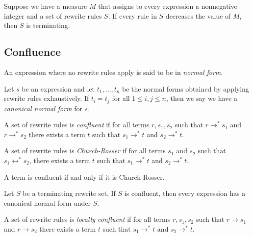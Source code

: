 \documentclass{article}
\begin{document}
\begin{theorem}
    Suppose we have a measure $M$ that assigns to every expression a nonnegative integer and
    a set of rewrite rules $S$. If every rule in $S$ decreases the value of $M$, then $S$ 
    is terminating.
\end{theorem}

\subsection{Confluence}

\begin{definition}
    An expression where no rewrite rules apply is said to be in \emph{normal form}.
\end{definition}

\begin{definition}
    Let $s$ be an expression and let $t_1, ..., t_n$ be the normal forms obtained by 
    applying rewrite rules exhaustively. If $t_i=t_j$ for all $1\leq i,j\leq n$, then we 
    say we have a \emph{canonical normal form} for $s$.
\end{definition}

\begin{definition}
    A set of rewrite rules is \emph{confluent} if for all terms $r,s_1,s_2$ such that 
    $r\to^*s_1$ and $r\to^*s_2$ there exists a term $t$ such that 
    $s_1\to^*t$ and $s_2\to^*t$.
\end{definition}

\begin{definition}
    A set of rewrite rules is \emph{Church-Rosser} if for all terms $s_1$ and $s_2$
    such that $s_1\leftrightarrow^* s_2$, there exists a term $t$ such that $s_1\to^*t$
    and $s_2\to^* t$.
\end{definition}

\begin{theorem}
    A term is confluent if and only if it is Church-Rosser.
\end{theorem}

\begin{theorem}
    Let $S$ be a terminating rewrite set. If $S$ is confluent, then every expression has a 
    canonical normal form under $S$.
\end{theorem}

\begin{definition}
    A set of rewrite rules is \emph{locally confluent} if for all terms $r,s_1,s_2$ such that 
    $r\to s_1$ and $r\to s_2$ there exists a term $t$ such that 
    $s_1\to^*t$ and $s_2\to^*t$.
\end{definition}
\end{document}
